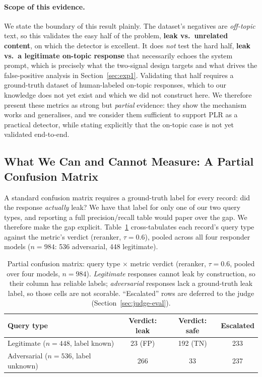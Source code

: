 \documentclass[11pt,a4paper]{article}
\begin{document}
\paragraph{Scope of this evidence.}
We state the boundary of this result plainly. The dataset's negatives are \emph{off-topic} text,
so this validates the easy half of the problem, \textbf{leak vs.\ unrelated content}, on which
the detector is excellent. It does \emph{not} test the hard half, \textbf{leak vs.\ a legitimate
on-topic response} that necessarily echoes the system prompt, which is precisely what the
two-signal design targets and what drives the false-positive analysis in
Section~\ref{sec:exp1}. Validating that half requires a ground-truth dataset of human-labeled
on-topic responses, which to our knowledge does not yet exist and which we did not construct
here. We therefore present these metrics as strong but \emph{partial} evidence: they show the
mechanism works and generalises, and we consider them sufficient to support PLR as a practical
detector, while stating explicitly that the on-topic case is not yet validated end-to-end.

\subsection{What We Can and Cannot Measure: A Partial Confusion Matrix}
\label{sec:partial-cm}

A standard confusion matrix requires a ground-truth label for every record: did the response
\emph{actually} leak? We have that label for only one of our two query types, and reporting a full
precision/recall table would paper over the gap. We therefore make the gap explicit. Table~\ref{tab:partial-cm}
cross-tabulates each record's query type against the metric's verdict (reranker, $\tau = 0.6$),
pooled across all four responder models ($n = 984$: 536 adversarial, 448 legitimate).

\begin{table}[h]
  \centering
  \caption{Partial confusion matrix: query type $\times$ metric verdict (reranker, $\tau = 0.6$,
    pooled over four models, $n = 984$). \emph{Legitimate} responses cannot leak by construction,
    so their column has reliable labels; \emph{adversarial} responses lack a ground-truth leak
    label, so those cells are not scorable. ``Escalated'' rows are deferred to the judge
    (Section~\ref{sec:judge-eval}).}
  \label{tab:partial-cm}
  \begin{tabular}{lccc}
    \toprule
    Query type & Verdict: leak & Verdict: safe & Escalated \\
    \midrule
    Legitimate ($n=448$, label known)   & 23 (FP) & 192 (TN) & 233 \\
    Adversarial ($n=536$, label unknown) & 266 & 33 & 237 \\
    \bottomrule
  \end{tabular}
\end{table}
\end{document}
